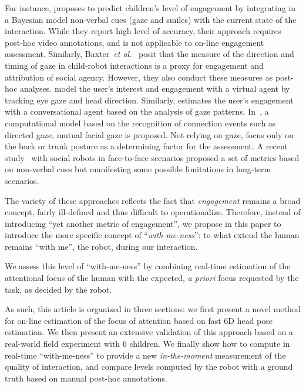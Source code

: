 \documentclass{sig-alternate}
\newcommand{\etal}{\textit{et al.}\xspace}
\begin{document}

For instance, \cite{Castellano:2009} proposes to predict children's level of
engagement by integrating in a Bayesian model non-verbal cues (gaze and smiles)
with the current state of the interaction. While they report high level of
accuracy, their approach requires post-hoc video annotations, and is not
applicable to on-line engagement assessment. Similarly,
Baxter~\etal~\cite{baxter2014tracking} posit that the measure of the direction
and timing of gaze in child-robot interactions is a proxy for engagement and
attribution of social agency. However, they also conduct these measures as
post-hoc analyses.  \cite{peters2010investigating} model the user's interest and
engagement with a virtual agent by tracking eye gaze and head direction.
Similarly, \cite{ishii2011combining} estimates the user's engagement with a
conversational agent based on the analysis of gaze patterns.
In~\cite{Rich:2010}, a computational model based on the recognition of
connection events such as directed gaze, mutual facial gaze is proposed. Not
relying on gaze, \cite{Sanghvi:2011} focus only on the back or trunk posture as
a determining factor for the assessment. A recent study~\cite{anzalone} with
social robots in face-to-face scenarios proposed a set of metrics based on
non-verbal cues but manifesting some possible limitations in long-term
scenarios.

The variety of these approaches reflects the fact that \emph{engagement} remains
a broad concept, fairly ill-defined and thus difficult to operationalize.
Therefore, instead of introducing ``yet another metric of engagement'', we
propose in this paper to introduce the more specific concept of
``\emph{with-me-ness}'': to what extend the human remains ``with me'', the
robot, during our interaction.

We assess this level of ``with-me-ness'' by combining real-time estimation of the
attentional focus of the human with the expected, {\it a priori} focus
requested by the task, as decided by the robot.

As such, this article is organized in three sections: we first present a novel
method for on-line estimation of the focus of attention based on fast 6D head
pose estimation. We then present an extensive validation of this approach based on
a real-world field experiment with 6 children. We finally show how to compute in
real-time ``with-me-ness'' to provide a new \emph{in-the-moment} measurement of
the quality of interaction, and compare levels computed by the robot with a
ground truth based on manual post-hoc annotations.
\end{document}
